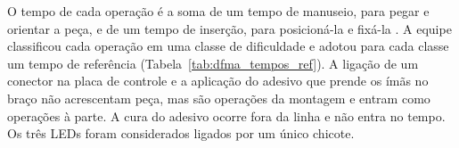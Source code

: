 
O tempo de cada operação é a soma de um tempo de manuseio, para pegar e orientar a peça, e de um tempo de inserção, para posicioná-la e fixá-la \cite{boothroyd2011product}. A equipe classificou cada operação em uma classe de dificuldade e adotou para cada classe um tempo de referência (Tabela~\ref{tab:dfma_tempos_ref}). A ligação de um conector na placa de controle e a aplicação do adesivo que prende os ímãs no braço não acrescentam peça, mas são operações da montagem e entram como operações à parte. A cura do adesivo ocorre fora da linha e não entra no tempo. Os três LEDs foram considerados ligados por um único chicote.

